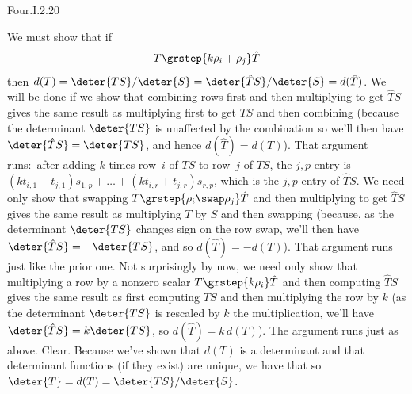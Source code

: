 \begin{ans}{Four.I.2.20}
      \begin{exparts}
        \partsitem We must show that if
          \begin{equation*}
            T\grstep{k\rho_i+\rho_j}\hat{T}
          \end{equation*}
          then $d(T)=\deter{TS}/\deter{S}
          =\deter{\hat{T}S}/\deter{S}=d(\hat{T})$.
          We will be done if we show that combining rows first and
          then multiplying to get \( \hat{T}S \) gives the same result as
          multiplying first to get \( TS \) and then combining
          (because the determinant \( \deter{TS} \) is unaffected by the
          combination so we'll then have \( \deter{\hat{T}S}=\deter{TS} \), and
          hence \( d(\hat{T})=d(T) \)).
          That argument runs:~after adding
          \( k \) times row~\( i \) of \( TS \) to
          row~$j$ of \( TS \), the \( j,p \) entry is
          \( (kt_{i,1}+t_{j,1})s_{1,p}+\dots+(kt_{i,r}+t_{j,r})s_{r,p} \),
          which is the \( j,p \) entry of \( \hat{T}S \).
        \partsitem We need only show that swapping
          $
            T\smash[b]{\grstep{\rho_i\swap\rho_j}}\hat{T}
          $
          and then multiplying to get \( \hat{T}S \) gives the same result as
          multiplying \( T \) by \( S \) and then swapping (because,
          as the determinant \( \deter{TS} \) changes sign on
          the row swap, we'll then have \( \deter{\hat{T}S}=-\deter{TS} \),
          and so \( d(\hat{T})=-d(T) \)).
          That argument runs just like the prior one.
        \partsitem Not surprisingly by now, we need only show that
          multiplying a row by a nonzero scalar
          $
            T\smash[b]{\grstep{k\rho_i}}\hat{T}
          $
          and then computing \( \hat{T}S \) gives the same result as
          first computing \( TS \) and then multiplying the row by \( k \)
          (as the determinant \( \deter{TS} \) is rescaled by \( k \)
          the multiplication, we'll have \( \deter{\hat{T}S}=k\deter{TS} \),
          so \( d(\hat{T})=k\,d(T) \)).
          The argument runs just as above.
        \partsitem Clear.
        \partsitem Because we've shown that \( d(T) \) is a determinant
          and that determinant functions (if they exist) are
          unique, we have that
          so \( \deter{T}=d(T)=\deter{TS}/\deter{S} \).
      \end{exparts}
    
\end{ans}
